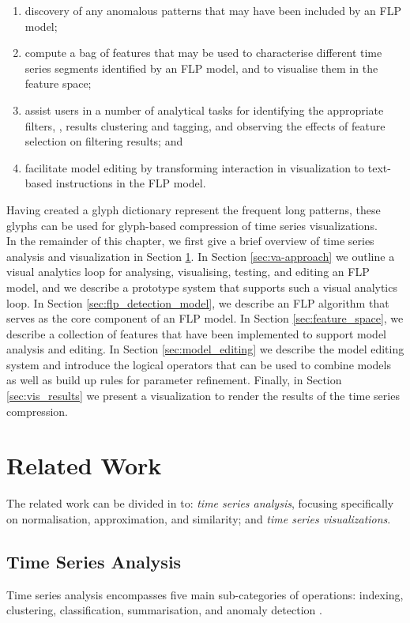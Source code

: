 %
\begin{enumerate}
\item discovery of any anomalous patterns that may have been included by an FLP model;
\item compute a bag of features that may be used to characterise different time series segments identified by an FLP model, and to visualise them in the feature space;
\item assist users in a number of analytical tasks for identifying the appropriate filters, \eg, results clustering and tagging, and observing the effects of feature selection on filtering results; and
\item facilitate model editing by transforming interaction in visualization to text-based instructions in the FLP model.
\end{enumerate}

Having created a glyph dictionary represent the frequent long patterns, these glyphs can be used for glyph-based compression of time series visualizations.\\

In the remainder of this chapter, we first give a brief overview of time series analysis and visualization in Section \ref{sec:related_work}.
In Section \ref{sec:va-approach} we outline a visual analytics loop for analysing, visualising, testing, and editing an FLP model, and we describe a prototype system that supports such a visual analytics loop.
In Section \ref{sec:flp_detection_model}, we describe an FLP algorithm that serves as the core component of an FLP model.
In Section \ref{sec:feature_space}, we describe a collection of features that have been implemented to support model analysis and editing.
In Section \ref{sec:model_editing} we describe the model editing system and introduce the logical operators that can be used to combine models as well as build up rules for parameter refinement. Finally, in Section \ref{sec:vis_results} we present a visualization to render the results of the time series compression. 

\section{Related Work}
\label{sec:related_work}

The related work can be divided in to: \emph{time series analysis}, focusing specifically on normalisation, approximation, and similarity; and \emph{time series visualizations}.

\subsection{Time Series Analysis}
\label{sec:time_analysis}
Time series analysis encompasses five main sub-categories of operations: indexing, clustering, classification, summarisation, and anomaly detection \cite{lina2003}. 

